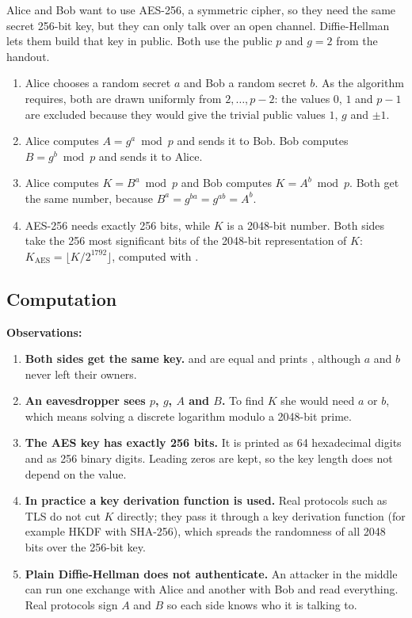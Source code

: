 \documentclass[11pt,a4paper]{article}
\begin{document}
Alice and Bob want to use AES-256, a symmetric cipher, so they need the same secret 256-bit key,
but they can only talk over an open channel. Diffie-Hellman lets them build that key in public.
Both use the public $p$ and $g = 2$ from the handout.

\begin{enumerate}
  \item Alice chooses a random secret $a$ and Bob a random secret $b$. As the algorithm requires,
  both are drawn uniformly from $2, \dots, p - 2$: the values $0$, $1$ and $p - 1$ are excluded
  because they would give the trivial public values $1$, $g$ and $\pm 1$.
  \item Alice computes $A = g^{a} \bmod p$ and sends it to Bob. Bob computes $B = g^{b} \bmod p$
  and sends it to Alice.
  \item Alice computes $K = B^{a} \bmod p$ and Bob computes $K = A^{b} \bmod p$. Both get the same
  number, because $B^{a} = g^{b a} = g^{a b} = A^{b}$.
  \item AES-256 needs exactly 256 bits, while $K$ is a 2048-bit number. Both sides take the 256
  most significant bits of the 2048-bit representation of $K$:
  $K_{\mathrm{AES}} = \lfloor K / 2^{1792} \rfloor$, computed with .
\end{enumerate}

\subsection{Computation}




\textbf{Observations:}
\begin{enumerate}
  \item \textbf{Both sides get the same key.}  and  are equal and
   prints , although $a$ and $b$ never left their owners.
  \item \textbf{An eavesdropper sees $p$, $g$, $A$ and $B$.} To find $K$ she would need $a$ or $b$,
  which means solving a discrete logarithm modulo a 2048-bit prime.
  \item \textbf{The AES key has exactly 256 bits.} It is printed as 64 hexadecimal digits and as
  256 binary digits. Leading zeros are kept, so the key length does not depend on the value.
  \item \textbf{In practice a key derivation function is used.} Real protocols such as TLS do not
  cut $K$ directly; they pass it through a key derivation function (for example HKDF with SHA-256),
  which spreads the randomness of all 2048 bits over the 256-bit key.
  \item \textbf{Plain Diffie-Hellman does not authenticate.} An attacker in the middle can run one
  exchange with Alice and another with Bob and read everything. Real protocols sign $A$ and $B$
  so each side knows who it is talking to.
\end{enumerate}
\end{document}
